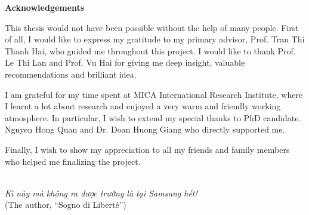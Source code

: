 
\cleardoublepage
{}


\begin{center}
\textbf{Acknowledgements}
\end{center}

This thesis would not have been possible without the help of many people.
First of all, I would like to express my gratitude to my primary advisor, Prof. Tran Thi Thanh Hai, who guided me throughout this project.
I would like to thank Prof. Le Thi Lan and Prof. Vu Hai for giving me deep insight, valuable recommendations and brilliant idea.

I am grateful for my time spent at MICA International Research Institute, where I learnt a lot about research and enjoyed a very warm and friendly working atmosphere.
In particular, I wish to extend my special thanks to PhD candidate. Nguyen Hong Quan and Dr. Doan Huong Giang who directly supported me.

Finally, I wish to show my appreciation to all my friends and family members who helped me finalizing the project.
\\\\


\bigskip

\begin{otherlanguage}{vietnamese}
\begin{flushright}
\textit{Kì này mà không ra được trường là tại Samsung hết!}\\
(The author, ``Sogno di Liberté'')
\end{flushright}
\end{otherlanguage}





